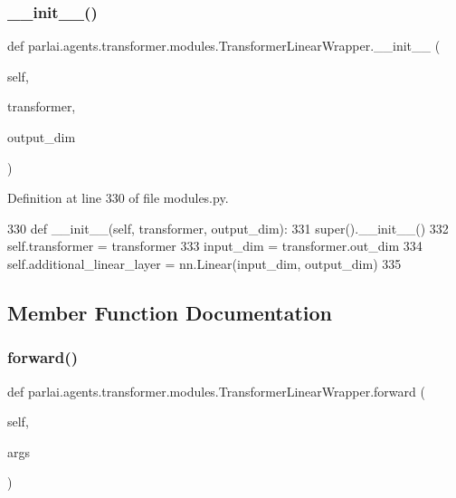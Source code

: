 \subsubsection{\texorpdfstring{\+\_\+\+\_\+init\+\_\+\+\_\+()}{\_\_init\_\_()}}
{\footnotesize\ttfamily def parlai.\+agents.\+transformer.\+modules.\+Transformer\+Linear\+Wrapper.\+\_\+\+\_\+init\+\_\+\+\_\+ (\begin{DoxyParamCaption}\item[{}]{self,  }\item[{}]{transformer,  }\item[{}]{output\+\_\+dim }\end{DoxyParamCaption})}



Definition at line 330 of file modules.\+py.


\begin{DoxyCode}
330     \textcolor{keyword}{def }\_\_init\_\_(self, transformer, output\_dim):
331         super().\_\_init\_\_()
332         self.transformer = transformer
333         input\_dim = transformer.out\_dim
334         self.additional\_linear\_layer = nn.Linear(input\_dim, output\_dim)
335 
\end{DoxyCode}


\subsection{Member Function Documentation}
\mbox{\label{classparlai_1_1agents_1_1transformer_1_1modules_1_1TransformerLinearWrapper_a82f571e85719bde36f8fcf09f27d3e4c}} 
\subsubsection{\texorpdfstring{forward()}{forward()}}
{\footnotesize\ttfamily def parlai.\+agents.\+transformer.\+modules.\+Transformer\+Linear\+Wrapper.\+forward (\begin{DoxyParamCaption}\item[{}]{self,  }\item[{}]{args }\end{DoxyParamCaption})}

